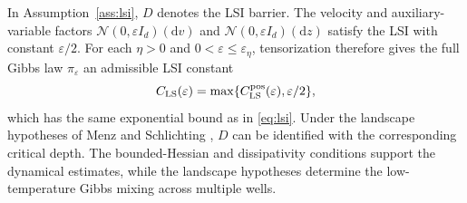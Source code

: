 \documentclass[11pt]{article}
\theoremstyle{definition}
\newcommand{\dd}{\mathrm d}
\newcommand{\Id}{I}
\newcommand{\eps}{\varepsilon}
\begin{document}
In Assumption~\ref{ass:lsi}, $D$ denotes the LSI barrier. The velocity and
auxiliary-variable factors $\mathcal N(0,\eps\Id_d)(\dd v)$ and
$\mathcal N(0,\eps\Id_d)(\dd z)$
satisfy the LSI with
constant $\eps/2$. For each $\eta>0$ and
$0<\eps\leq\eps_\eta$, tensorization therefore gives the full Gibbs law
$\pi_\eps$ an admissible LSI constant
\begin{equation}\label{eq:tensorizedlsi}
 C_{\rm LS}(\eps)=\max\{C_{\rm LS}^{\rm pos}(\eps),\eps/2\},
\end{equation}
which has the same exponential bound as in \eqref{eq:lsi}. Under the landscape
hypotheses of Menz and Schlichting \cite{MenzSchlichting2014}, $D$ can be identified
with the corresponding critical depth. The bounded-Hessian and dissipativity conditions
support the dynamical estimates, while the landscape hypotheses determine the
low-temperature Gibbs mixing across multiple wells.
\end{document}

